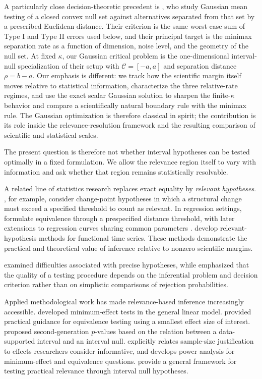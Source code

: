 \documentclass[11pt]{article}
\theoremstyle{remark}
\begin{document}
A particularly close decision-theoretic precedent is \citet{blanchard2018}, who study Gaussian mean testing of a closed convex null set against alternatives separated from that set by a prescribed Euclidean distance. Their criterion is the same worst-case sum of Type I and Type II errors used below, and their principal target is the minimax separation rate as a function of dimension, noise level, and the geometry of the null set. At fixed $\kappa$, our Gaussian critical problem is the one-dimensional interval-null specialization of their setup with $\mathcal C=[-a,a]$ and separation distance $\rho=b-a$. Our emphasis is different: we track how the scientific margin itself moves relative to statistical information, characterize the three relative-rate regimes, and use the exact scalar Gaussian solution to sharpen the finite-$\kappa$ behavior and compare a scientifically natural boundary rule with the minimax rule. The Gaussian optimization is therefore classical in spirit; the contribution is its role inside the relevance-resolution framework and the resulting comparison of scientific and statistical scales.

The present question is therefore not whether interval hypotheses can be tested optimally in a fixed formulation. We allow the relevance region itself to vary with information and ask whether that region remains statistically resolvable.

A related line of statistics research replaces exact equality by \emph{relevant hypotheses}. \citet{dette2016}, for example, consider change-point hypotheses in which a structural change must exceed a specified threshold to count as relevant. In regression settings, \citet{dette2018} formulate equivalence through a prespecified distance threshold, with later extensions to regression curves sharing common parameters \citep{mollenhoff2020}. \citet{dette2020} develop relevant-hypothesis methods for functional time series. These methods demonstrate the practical and theoretical value of inference relative to nonzero scientific margins.

\citet{berger1987} examined difficulties associated with precise hypotheses, while \citet{perlman1999} emphasized that the quality of a testing procedure depends on the inferential problem and decision criterion rather than on simplistic comparisons of rejection probabilities.

Applied methodological work has made relevance-based inference increasingly accessible. \citet{murphy1999} developed minimum-effect tests in the general linear model. \citet{lakens2018} provided practical guidance for equivalence testing using a smallest effect size of interest. \citet{blume2018} proposed second-generation $p$-values based on the relation between a data-supported interval and an interval null. \citet{lakens2022} explicitly relates sample-size justification to effects researchers consider informative, and \citet{riesthuis2024} develops power analysis for minimum-effect and equivalence questions. \citet{ongaro2024} provide a general framework for testing practical relevance through interval null hypotheses.
\end{document}
